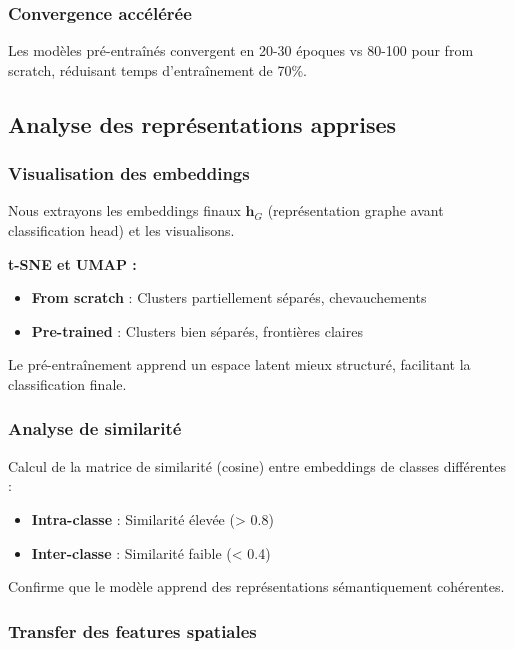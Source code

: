 \subsubsection{Convergence accélérée}

Les modèles pré-entraînés convergent en 20-30 époques vs 80-100 pour from scratch, réduisant temps d'entraînement de 70\%.

\subsection{Analyse des représentations apprises}

\subsubsection{Visualisation des embeddings}

Nous extrayons les embeddings finaux $\mathbf{h}_G$ (représentation graphe avant classification head) et les visualisons.

\textbf{t-SNE et UMAP :}
\begin{itemize}
    \item \textbf{From scratch} : Clusters partiellement séparés, chevauchements
    \item \textbf{Pre-trained} : Clusters bien séparés, frontières claires
\end{itemize}

Le pré-entraînement apprend un espace latent mieux structuré, facilitant la classification finale.

\subsubsection{Analyse de similarité}

Calcul de la matrice de similarité (cosine) entre embeddings de classes différentes :
\begin{itemize}
    \item \textbf{Intra-classe} : Similarité élevée (> 0.8)
    \item \textbf{Inter-classe} : Similarité faible (< 0.4)
\end{itemize}

Confirme que le modèle apprend des représentations sémantiquement cohérentes.

\subsubsection{Transfer des features spatiales}

